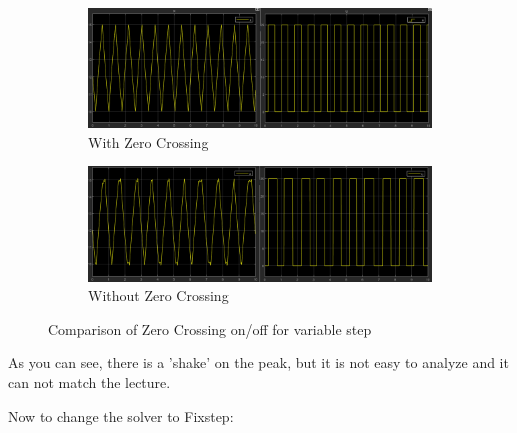 \begin{figure}[h]
    \centering
    \begin{subfigure}[b]{0.9\textwidth}
        \centering
        \includegraphics[width=\textwidth]{images/withzerocrossing.png}
        \caption{With Zero Crossing}
        \label{with}
    \end{subfigure}
    \hfill
    \begin{subfigure}[b]{0.9\textwidth}
        \centering
        \includegraphics[width=\textwidth]{images/withoutzerocrossing.png}
        \caption{Without Zero Crossing}
        \label{without}
    \end{subfigure}
    \caption{Comparison of Zero Crossing on/off for variable step}
    \label{compare-zero-crossing}
\end{figure}

As you can see, there is a 'shake' on the peak, but it is not easy to analyze and it can not match the lecture.

Now to change the solver to Fixstep:

